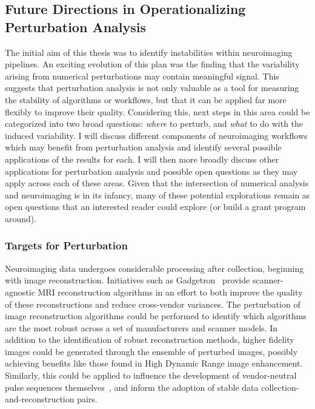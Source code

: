 \subsection{Future Directions in Operationalizing Perturbation Analysis}
The initial aim of this thesis was to identify instabilities within neuroimaging pipelines. An exciting evolution
of this plan was the finding that the variability arising from numerical perturbations may contain meaningful signal.
This suggests that perturbation analysis is not only valuable as a tool for measuring the stability of algorithms or
workflows, but that it can be applied far more flexibly to improve their quality. Considering this, next steps in
this area could be categorized into two broad questions: \textit{where} to perturb, and \textit{what} to do with the
induced variability. I will discuss different components of neuroimaging workflows which may benefit from perturbation
analysis and identify several possible applications of the results for each. I will then more broadly discuss other
applications for perturbation analysis and possible open questions as they may apply across each of these areas. Given
that the intersection of numerical analysis and neuroimaging is in its infancy, many of these potential explorations
remain as open questions that an interested reader could explore (or build a grant program around).

\subsubsection{Targets for Perturbation}

Neuroimaging data undergoes considerable processing after collection, beginning with image reconstruction. Initiatives
such as Gadgetron~\cite{hansen2013gadgetron} provide scanner-agnostic MRI reconstruction algorithms in an effort to
both improve the quality of these reconstructions and reduce cross-vendor variances. The perturbation of image
reconstruction algorithms could be performed to identify which algorithms are the most robust across a set of
manufacturers and scanner models. In addition to the identification of robust reconstruction methods, higher fidelity
images could be generated through the ensemble of perturbed images, possibly achieving benefits like those found in
High Dynamic Range image enhancement. Similarly, this could be applied to influence the development of vendor-neutral
pulse sequences themselves~\cite{karakuzu2020qmrlab}, and inform the adoption of stable data
collection-and-reconstruction pairs.

